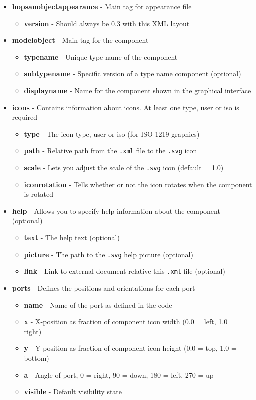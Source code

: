 \documentclass[a4paper,pdftex]{article}
\begin{document}
\begin{itemize}
\item \textbf{hopsanobjectappearance} - Main tag for appearance file
\begin{itemize}
\item \textbf{version} - Should always be 0.3 with this XML layout
\end{itemize}
\item \textbf{modelobject} - Main tag for the component
\begin{itemize}
\item \textbf{typename} - Unique type name of the component
\item \textbf{subtypename} - Specific version of a type name component (optional)
\item \textbf{displayname} - Name for the component shown in the graphical interface
\end{itemize}
\item \textbf{icons} - Contains information about icons. At least one type, user or iso is required
\begin{itemize}
\item \textbf{type} - The icon type, user or iso (for ISO 1219 graphics)
\item \textbf{path} - Relative path from the \texttt{.xml} file to the \texttt{.svg} icon
\item \textbf{scale} - Lets you adjust the scale of the \texttt{.svg} icon (default = 1.0)
\item \textbf{iconrotation} - Tells whether or not the icon rotates when the component is rotated
\end{itemize}
\item \textbf{help} - Allows you to specify help information about the component (optional)
\begin{itemize}
\item \textbf{text} - The help text (optional)
\item \textbf{picture} - The path to the \texttt{.svg} help picture (optional)
\item \textbf{link} - Link to external document relative this \texttt{.xml} file (optional) 
\end{itemize}
\item \textbf{ports} - Defines the positions and orientations for each port
\begin{itemize}
\item \textbf{name} - Name of the port as defined in the code
\item \textbf{x} - X-position as fraction of component icon width (0.0 = left, 1.0 = right)
\item \textbf{y} - Y-position as fraction of component icon height (0.0 = top, 1.0 = bottom)
\item \textbf{a} - Angle of port, 0 = right, 90 = down, 180 = left, 270 = up
\item \textbf{visible} - Default visibility state
\end{itemize}
\end{itemize}
\end{document}
